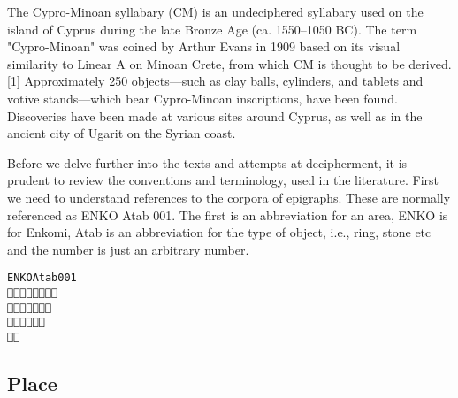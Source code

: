 The Cypro-Minoan syllabary (CM) is an undeciphered syllabary used on the island of Cyprus during the late Bronze Age (ca. 1550–1050 BC). The term "Cypro-Minoan" was coined by Arthur Evans in 1909 based on its visual similarity to Linear A on Minoan Crete, from which CM is thought to be derived.[1] Approximately 250 objects—such as clay balls, cylinders, and tablets and votive stands—which bear Cypro-Minoan inscriptions, have been found. Discoveries have been made at various sites around Cyprus, as well as in the ancient city of Ugarit on the Syrian coast.



Before we delve further into the texts and attempts at decipherment, it is prudent to review the conventions and terminology, used in the literature. First we need to understand references to the corpora of epigraphs. These are normally referenced as ENKO Atab 001. The first is an abbreviation for an area, ENKO is for Enkomi, Atab is an abbreviation for the type of object, i.e., ring, stone etc and the number is just an arbitrary number.

\begin{alltt}\cminoan
{\arial ENKO Atab 001} 
󱀀󱀁󱀂󱀃󱀄󱀅󱀆󱀈
 󱀊󱀋󱀌󱀍󱀎󱀏󱀐
󱀑󱀒󱀓󱀔󱀕󱀖
󱀇󱀉
\end{alltt}

\subsection{Place}

